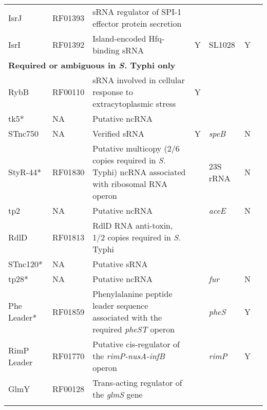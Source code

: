 \begin{longtable}{ l
    				p{0.3in}
				p{1.5in}
				c
				p{0.5in}
				p{0.5in}
				p{1in}
				}
    IsrJ  & RF01393 & sRNA regulator of SPI-1 effector protein secretion &       &       &       &  \textcite{Sittka2008, Padalon-Brauch2008} \\
    IsrI  & RF01392 & Island-encoded Hfq-binding sRNA & Y     & SL1028 & Y     &  \textcite{Sittka2008, Padalon-Brauch2008, Chao2012} \\
     \multicolumn{7}{l}{\textbf{Required or ambiguous in {\it S.} Typhi only}}\\
    RybB  & RF00110 & sRNA involved in cellular response to extracytoplasmic stress & Y     &       &       &  \textcite{Vogel2009} \\
    tk5*  & NA    & Putative ncRNA &       &       &       & \textcite{Raghavan2011,Rivas2001} \\
    STnc750 & NA    & Verified sRNA & Y     & {\it speB}  & N     & \textcite{Kroger2012, Chao2012} \\
    StyR-44* & RF01830 & Putative multicopy (2/6 copies required in {\it S.} Typhi) ncRNA associated with ribosomal RNA operon &       & 23S rRNA & N     &  \textcite{Chinni2010} \\
    tp2   & NA    & Putative ncRNA &       & {\it aceE}  & N     &  \textcite{Raghavan2011,Rivas2001} \\
    RdlD  & RF01813 & RdlD RNA anti-toxin, 1/2 copies required in {\it S.} Typhi &       &       &       & \textcite{Kawano2002} \\
    STnc120* & NA    & Putative sRNA &       &       &       & \textcite{Sittka2008} \\
    tp28* & NA    & Putative ncRNA &       & {\it fur}   & N     &  \textcite{Raghavan2011,Rivas2001} \\
    Phe Leader* & RF01859 & Phenylalanine peptide leader sequence associated with the required {\it pheST} operon &       & {\it pheS}  & Y     & \textcite{Zurawski1978} \\
    RimP Leader & RF01770 & Putative cis-regulator of the {\it rimP-nusA-infB} operon &       & {\it rimP}  & Y     & \textcite{Naville2010} \\
    GlmY  & RF00128 & Trans-acting regulator of the {\it glmS} gene &       &       &       & \textcite{Urban2008} \\
    \bottomrule
    \label{tab:ncrna}%
    \end{longtable}%
\endgroup

